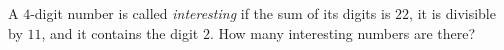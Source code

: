 A $4$-digit number is called \emph{interesting} if the sum of its digits is $22$, it is divisible by $11$, and it contains the digit $2$. How many interesting numbers are there?
